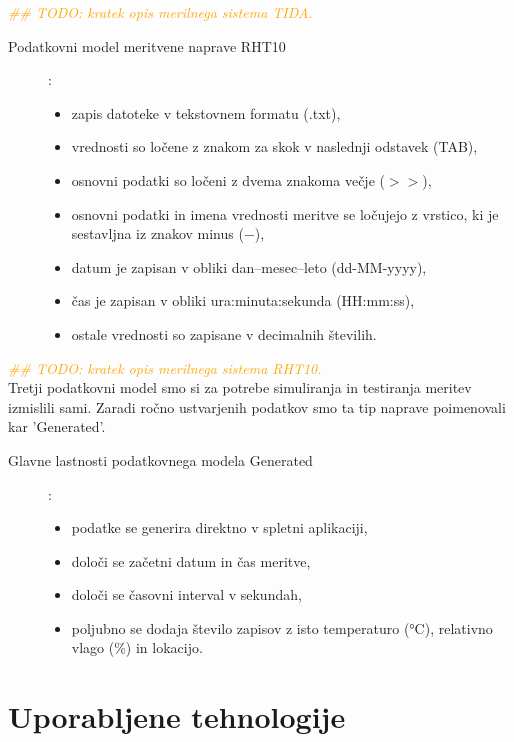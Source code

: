 \documentclass[a4paper, 12pt]{book}
\begin{document}
\textcolor{orange}{\textit{ \#\# TODO: kratek opis merilnega sistema TIDA.~\cite{magistrska-crnigoj}}} \\

\begin{description}
\item[Podatkovni model meritvene naprave RHT10]:
\begin{itemize}
\item zapis datoteke v tekstovnem formatu (.txt),
\item vrednosti so ločene z znakom za skok v naslednji odstavek (TAB),
\item osnovni podatki so ločeni z dvema znakoma večje ($>>$),
\item osnovni podatki in imena vrednosti meritve se ločujejo z vrstico, ki je sestavljna iz znakov minus ($-$),
\item datum je zapisan v obliki dan--mesec--leto (dd-MM-yyyy),
\item čas je zapisan v obliki ura:minuta:sekunda (HH:mm:ss),
\item ostale vrednosti so zapisane v decimalnih številih.
\end{itemize}
\end{description}

\textcolor{orange}{\textit{ \#\# TODO: kratek opis merilnega sistema RHT10.~\cite{rht10-dialogger}}} \\



\noindent Tretji podatkovni model smo si za potrebe simuliranja in testiranja meritev izmislili sami. Zaradi ročno ustvarjenih podatkov smo ta tip naprave poimenovali kar 'Generated'.


\begin{description}
\item[Glavne lastnosti podatkovnega modela Generated]:
\begin{itemize}
\item podatke se generira direktno v spletni aplikaciji,
\item določi se začetni datum in čas meritve,
\item določi se časovni interval v sekundah,
\item poljubno se dodaja število zapisov z isto temperaturo (°C), relativno vlago (\%) in lokacijo.
\end{itemize}
\end{description}

\chapter{Uporabljene tehnologije}
\label{uporabljene-tehnologije}
\end{document}
